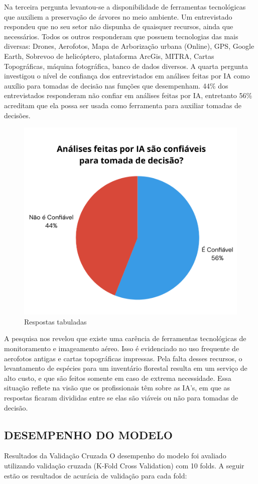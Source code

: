 Na terceira pergunta levantou-se a disponibilidade de ferramentas tecnológicas que auxiliem a preservação de árvores no meio ambiente. Um entrevistado respondeu que no seu setor não dispunha de quaisquer recursos, ainda que necessários. Todos os outros responderam que possuem tecnologias das mais diversas: Drones, Aerofotos, Mapa de Arborização urbana (Online), GPS, Google Earth, Sobrevoo de helicóptero, plataforma ArcGis, MITRA, Cartas Topográficas, máquina fotográfica, banco de dados diversos.
A quarta pergunta investigou o nível de confiança dos entrevistados em análises feitas por IA como auxílio para tomadas de decisão nas funções que desempenham. 44\% dos entrevistados responderam não confiar em análises feitas por IA, entretanto 56\% acreditam que ela possa ser usada como ferramenta para auxiliar tomadas de decisões.
\begin{figure}[!h]
    \centering
    \caption{Respostas tabuladas}
    \label{Gráfico 2}
    \includegraphics[width=0.65\linewidth]{Illustrations/pizza2.png}
    \end{figure}

A pesquisa nos revelou que existe uma carência de ferramentas tecnológicas de monitoramento e imageamento aéreo. Isso é evidenciado no uso frequente de aerofotos antigas e cartas topográficas impressas. Pela falta desses recursos, o levantamento de espécies para um inventário florestal resulta em um serviço de alto custo, e que são feitos somente em caso de extrema necessidade. Essa situação reflete na visão que os profissionais têm sobre as IA's, em que as respostas ficaram divididas entre se elas são viáveis ou não para tomadas de decisão.

\subsection*{DESEMPENHO DO MODELO}
Resultados da Validação Cruzada
O desempenho do modelo foi avaliado utilizando validação cruzada (K-Fold Cross Validation) com 10 folds. A seguir estão os resultados de acurácia de validação para cada fold:

